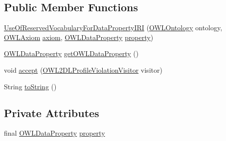 \subsection*{Public Member Functions}
\begin{DoxyCompactItemize}
\item 
\hyperlink{classorg_1_1semanticweb_1_1owlapi_1_1profiles_1_1_use_of_reserved_vocabulary_for_data_property_i_r_i_a806bf58240160f4ce33c74df5bd589b7}{Use\-Of\-Reserved\-Vocabulary\-For\-Data\-Property\-I\-R\-I} (\hyperlink{interfaceorg_1_1semanticweb_1_1owlapi_1_1model_1_1_o_w_l_ontology}{O\-W\-L\-Ontology} ontology, \hyperlink{interfaceorg_1_1semanticweb_1_1owlapi_1_1model_1_1_o_w_l_axiom}{O\-W\-L\-Axiom} \hyperlink{classorg_1_1semanticweb_1_1owlapi_1_1profiles_1_1_o_w_l_profile_violation_aa7c8e8910ed3966f64a2c003fb516214}{axiom}, \hyperlink{interfaceorg_1_1semanticweb_1_1owlapi_1_1model_1_1_o_w_l_data_property}{O\-W\-L\-Data\-Property} \hyperlink{classorg_1_1semanticweb_1_1owlapi_1_1profiles_1_1_use_of_reserved_vocabulary_for_data_property_i_r_i_afcf46a6e1202261a6c7f0f49d9e1c7e0}{property})
\item 
\hyperlink{interfaceorg_1_1semanticweb_1_1owlapi_1_1model_1_1_o_w_l_data_property}{O\-W\-L\-Data\-Property} \hyperlink{classorg_1_1semanticweb_1_1owlapi_1_1profiles_1_1_use_of_reserved_vocabulary_for_data_property_i_r_i_aef53a8d2bf2f37d679c482a6d8b60c80}{get\-O\-W\-L\-Data\-Property} ()
\item 
void \hyperlink{classorg_1_1semanticweb_1_1owlapi_1_1profiles_1_1_use_of_reserved_vocabulary_for_data_property_i_r_i_ab00408703041f3ff18a88992e9aa93a1}{accept} (\hyperlink{interfaceorg_1_1semanticweb_1_1owlapi_1_1profiles_1_1_o_w_l2_d_l_profile_violation_visitor}{O\-W\-L2\-D\-L\-Profile\-Violation\-Visitor} visitor)
\item 
String \hyperlink{classorg_1_1semanticweb_1_1owlapi_1_1profiles_1_1_use_of_reserved_vocabulary_for_data_property_i_r_i_a8ab82d1352092ca51b917d3c332a3663}{to\-String} ()
\end{DoxyCompactItemize}
\subsection*{Private Attributes}
\begin{DoxyCompactItemize}
\item 
final \hyperlink{interfaceorg_1_1semanticweb_1_1owlapi_1_1model_1_1_o_w_l_data_property}{O\-W\-L\-Data\-Property} \hyperlink{classorg_1_1semanticweb_1_1owlapi_1_1profiles_1_1_use_of_reserved_vocabulary_for_data_property_i_r_i_afcf46a6e1202261a6c7f0f49d9e1c7e0}{property}
\end{DoxyCompactItemize}


